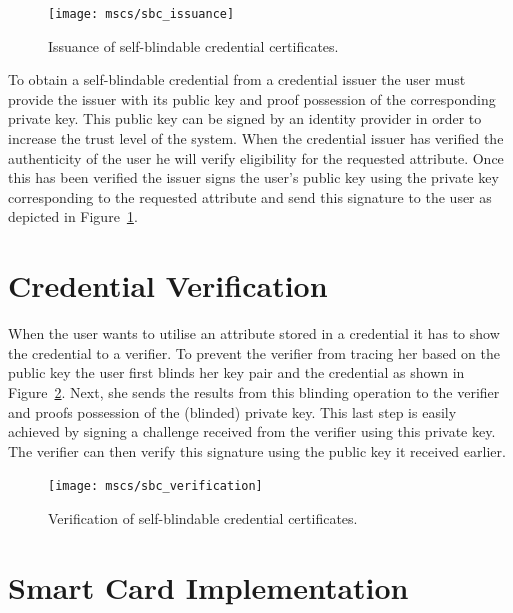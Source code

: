 \begin{figure}[ht]
  \centering
  \texttt{[image: mscs/sbc\_issuance]}
  \caption{Issuance of self-blindable credential certificates.}
  \label{fig:SBC-issuance}
\end{figure}

To obtain a self-blindable credential from a credential issuer the user must
provide the issuer with its public key and proof possession of the corresponding
private key. This public key can be signed by an identity provider in order to
increase the trust level of the system. When the credential issuer has verified
the authenticity of the user he will verify eligibility for the requested
attribute. Once this has been verified the issuer signs the user's public key
using the private key corresponding to the requested attribute and send this
signature to the user as depicted in Figure~\ref{fig:SBC-issuance}.

\section{Credential Verification}

When the user wants to utilise an attribute stored in a credential it has to
show the credential to a verifier. To prevent the verifier from tracing her
based on the public key the user first blinds her key pair and the credential as
shown in Figure~\ref{fig:SBC-verification}. Next, she sends the results from
this blinding operation to the verifier and proofs possession of the (blinded)
private key. This last step is easily achieved by signing a challenge received
from the verifier using this private key. The verifier can then verify this
signature using the public key it received earlier.

\begin{figure}[ht]
  \centering
  \texttt{[image: mscs/sbc\_verification]}
  \caption{Verification of self-blindable credential certificates.}
  \label{fig:SBC-verification}
\end{figure}

\section{Smart Card Implementation}

